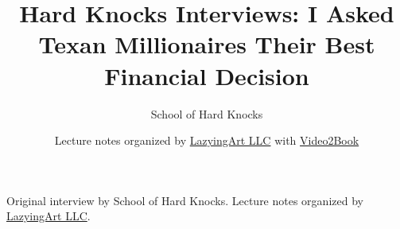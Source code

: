 \documentclass[11pt,oneside]{book}
\begin{document}
\frontmatter
\title{Hard Knocks Interviews: I Asked Texan Millionaires Their Best Financial Decision}
\author{School of Hard Knocks}
\date{Lecture notes organized by \href{https://lazying.art}{LazyingArt LLC} with \href{https://github.com/lachlanchen/Video2Book}{Video2Book}}
\maketitle
\begin{center}
\small Original interview by School of Hard Knocks. Lecture notes organized by \href{https://lazying.art}{LazyingArt LLC}.
\end{center}
\clearpage
\mainmatter

\end{document}
